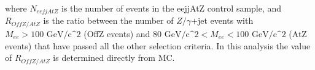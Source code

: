 \documentclass{cmspaper}
\begin{document}
\begin{linenumbers}
where $N_{eejjAtZ}$ is the number of events in the eejjAtZ control sample, and 
$R_{OffZ/AtZ}$ is the ratio between the number of $Z/\gamma$+jet events 
with $M_{ee} > 100\mbox{ GeV/c^2}$ (OffZ events) and $80\mbox{ GeV/c^2} < M_{ee} < 100\mbox{ GeV/c^2}$ 
(AtZ events) that have passed all the other selection criteria.
In this analysis the value of $R_{OffZ/AtZ}$ is determined directly from MC.
%

\end{linenumbers}
\end{document}
